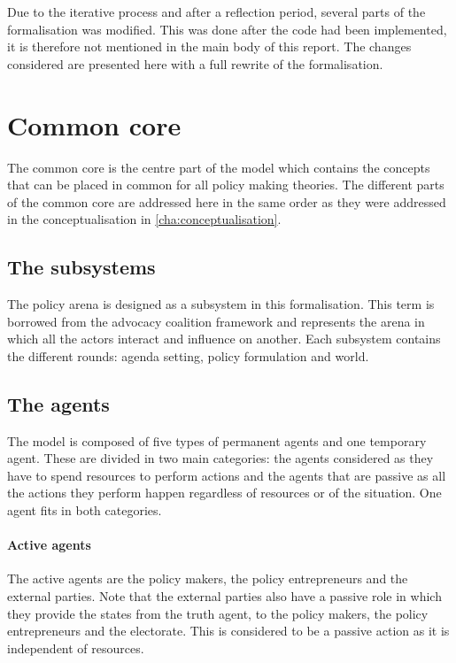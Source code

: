 Due to the iterative process and after a reflection period, several parts of the formalisation was modified. This was done after the code had been implemented, it is therefore not mentioned in the main body of this report. The changes considered are presented here with a full rewrite of the formalisation.

\section{Common core}

The common core is the centre part of the model which contains the concepts that can be placed in common for all policy making theories. The different parts of the common core are addressed here in the same order as they were addressed in the conceptualisation in \autoref{cha:conceptualisation}.

\subsection{The subsystems}

The policy arena is designed as a subsystem in this formalisation. This term is borrowed from the advocacy coalition framework and represents the arena in which all the actors interact and influence on another. Each subsystem contains the different rounds: agenda setting, policy formulation and world.

\subsection{The agents}

The model is composed of five types of permanent agents and one temporary agent. These are divided in two main categories: the agents considered as they have to spend resources to perform actions and the agents that are passive as all the actions they perform happen regardless of resources or of the situation. One agent fits in both categories.

\paragraph{Active agents}

The active agents are the policy makers, the policy entrepreneurs and the external parties. Note that the external parties also have a passive role in which they provide the states from the truth agent, to the policy makers, the policy entrepreneurs and the electorate. This is considered to be a passive action as it is independent of resources.

